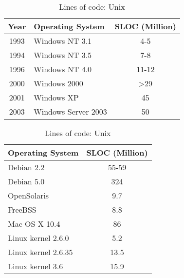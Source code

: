 
\begin{table}[ht]
\begin{minipage}[b]{0.5\linewidth}\centering
\begin{tabular}{clc}\hline
Year & Operating System & SLOC (Million)\\\hline
1993 & Windows NT 3.1 & 4-5\\
1994 & Windows NT 3.5 & 7-8\\
1996 & Windows NT 4.0 & 11-12\\
2000 & Windows 2000 & \textgreater29\\
2001 & Windows XP & 45\\
2003 & Windows Server 2003 & 50
\end{tabular}
\caption{Lines of code: Windows \cite{sloc}}
\label{tbl:sloc_win}
\end{minipage}
\hspace{0.5cm}
\begin{minipage}[b]{0.5\linewidth}\centering
\begin{tabular}{lc}\hline
Operating System & SLOC (Million)\\\hline
Debian 2.2 & 55-59\\
Debian 5.0 & 324\\
OpenSolaris & 9.7\\
FreeBSS & 8.8\\
Mac OS X 10.4 & 86\\
Linux kernel 2.6.0 & 5.2\\
Linux kernel 2.6.35 & 13.5\\
Linux kernel 3.6 & 15.9\\
\end{tabular}
\caption{Lines of code: Unix \cite{sloc}}
\label{tbl:sloc_unix}
\end{minipage}
\end{table}